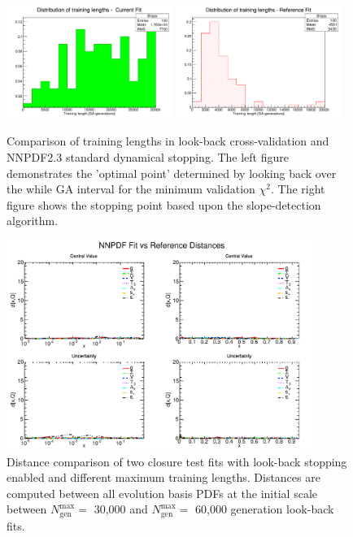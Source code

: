   \begin{figure}[!]
\centering
\includegraphics[width=0.48\textwidth]{7-PostLHC/figs/LB30kvsDYN/tl.pdf}
\includegraphics[width=0.48\textwidth]{7-PostLHC/figs/LB30kvsDYN/tl_ref.pdf}
\caption[Comparison of training lengths in look-back cross-validation and NNPDF2.3 standard dynamical stopping]{Comparison of training lengths in look-back cross-validation and NNPDF2.3 standard dynamical stopping. The left figure demonstrates the 'optimal point' determined by looking back over the while GA interval for the minimum validation $\chi^2$. The right figure shows the stopping point based upon the slope-detection algorithm.}
\label{fig:30kLBvsDYNtl}
\end{figure}

\begin{figure}[!]
\centering
\includegraphics[width=0.9\textwidth]{7-PostLHC/figs/LB30kvsLB60k/distances_evol.pdf}
\caption[Distance comparison of two closure test fits with look-back stopping enabled and different maximum training lengths]{Distance comparison of two closure test fits with look-back stopping enabled and different maximum training lengths. Distances are computed between all evolution basis PDFs at the initial scale between $N_{\text{gen}}^\text{max}=$ 30,000 and $N_{\text{gen}}^\text{max}=$ 60,000 generation look-back fits.}
\label{fig:30kLBvs60kLB}
\end{figure}

